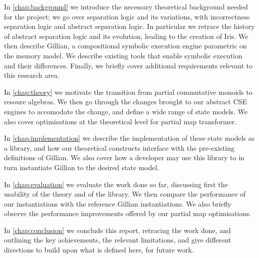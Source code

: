 In \autoref{chap:background} we introduce the necessary theoretical background needed for the project; we go over separation logic and its variations, with incorrectness separation logic and abstract separation logic. In particular we retrace the history of abstract separation logic and its evolution, leading to the creation of Iris. We then describe Gillian, a compositional symbolic execution engine parametric on the memory model. We describe existing tools that enable symbolic execution and their differences. Finally, we briefly cover additional requirements relevant to this research area.

In \autoref{chap:theory} we motivate the transition from partial commutative monoids to resoure algebras. We then go through the changes brought to our abstract CSE engines to accomodate the change, and define a wide range of state models. We also cover optimisations at the theoretical level for partial map transformer.

In \autoref{chap:implementation} we describe the implementation of these state models as a library, and how our theoretical constructs interface with the pre-existing definitions of Gillian. We also cover how a developer may use this library to in turn instantiate Gillian to the desired state model.

In \autoref{chap:evaluation} we evaluate the work done so far, discussing first the usability of the theory and of the library. We then compare the performance of our instantiations with the reference Gillian instantiations. We also briefly observe the performance improvements offered by our partial map optimisations.

In \autoref{chap:conclusion} we conclude this report, retracing the work done, and outlining the key achievements, the relevant limitations, and give different directions to build upon what is defined here, for future work.
